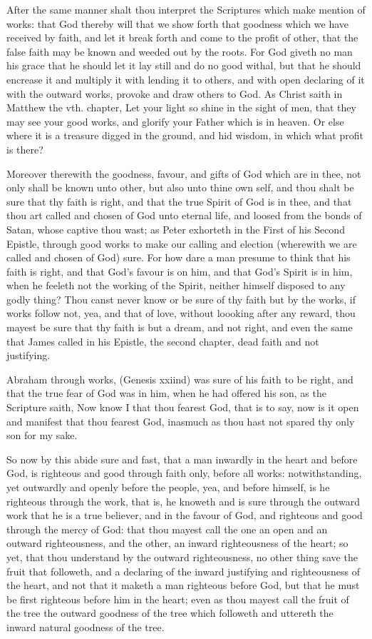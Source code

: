 After the same manner shalt thou interpret the Scriptures 
which make mention of works: that God thereby will that 
we show forth that goodness which we have received by 
faith, and let it break forth and come to the profit of other, 
that the false faith may be known and weeded out by the 
roots. For God giveth no man his grace that he should let 
it lay still and do no good withal, but that he should encrease
it and multiply it with lending it to others, and with 
open declaring of it with the outward works, provoke and 
draw others to God. As Christ saith in Matthew the vth. 
chapter, Let your light so shine in the sight of men, that they 
may see your good works, and glorify your Father which is 
in heaven. Or else where it is a treasure digged in the 
ground, and hid wisdom, in which what profit is there?

Moreover therewith the goodness, favour, and gifts of 
God which are in thee, not only shall be known unto other, 
but also unto thine own self, and thou shalt be sure that thy 
faith is right, and that the true Spirit of God is in thee, and 
that thou art called and chosen of God unto eternal life, 
and loosed from the bonds of Satan, whose captive thou 
wast; as Peter exhorteth in the First of his Second Epistle, 
through good works to make our calling and election 
(wherewith we are called and chosen of God) sure. For 
how dare a man presume to think that his faith is right, 
and that God's favour is on him, and that God's Spirit is 
in him, when he feeleth not the working of the Spirit, neither
himself disposed to any godly thing? Thou canst never
know or be sure of thy faith but by the works, if works 
follow not, yea, and that of love, without loooking after any 
reward, thou mayest be sure that thy faith is but a dream, 
and not right, and even the same that James called in his 
Epistle, the second chapter, dead faith and not justifying. 

Abraham through works, (Genesis xxiind) was sure of his
faith to be right, and that the true fear of God was in him, 
when he had offered his son, as the Scripture saith, Now 
know I that thou fearest God, that is to say, now is it 
open and manifest that thou fearest God, inasmuch as thou 
hast not spared thy only son for my sake. 


So now by this abide sure and fast, that a man inwardly 
in the heart and before God, is righteous and good through 
faith only, before all works: notwithstanding, yet outwardly
and openly before the people, yea, and before himself,
is he righteous through the work, that is, he knoweth
and is sure through the outward work that he is a 
true believer, and in the favour of God, and righteous and 
good through the mercy of God: that thou mayest call the 
one an open and an outward righteousness, and the other, 
an inward righteousness of the heart; so yet, that thou understand
by the outward righteousness, no other thing save 
the fruit that followeth, and a declaring of the inward 
justifying and righteousness of the heart, and not that it 
maketh a man righteous before God, but that he must be first 
righteous before him in the heart; even as thou mayest call the 
fruit of the tree the outward goodness of the tree which followeth
and uttereth the inward natural goodness of the tree. 

